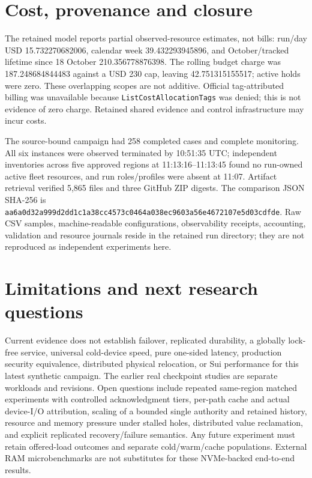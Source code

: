 \documentclass[11pt,a4paper]{article}
\begin{document}
\section{Cost, provenance and closure}\label{sec:provenance}
The retained model reports partial observed-resource estimates, not bills: run/day USD 15.732270682006, calendar week 39.432293945896, and October/tracked lifetime since 18 October 210.356778876398. The rolling budget charge was 187.248684844483 against a USD 230 cap, leaving 42.751315155517; active holds were zero. These overlapping scopes are not additive. Official tag-attributed billing was unavailable because \texttt{ListCostAllocationTags} was denied; this is not evidence of zero charge. Retained shared evidence and control infrastructure may incur costs.

The source-bound campaign had 258 completed cases and complete monitoring. All six instances were observed terminated by 10:51:35 UTC; independent inventories across five approved regions at 11:13:16--11:13:45 found no run-owned active fleet resources, and run roles/profiles were absent at 11:07. Artifact retrieval verified 5,865 files and three GitHub ZIP digests. The comparison JSON SHA-256 is \texttt{aa6a0d32a999d2dd\allowbreak 1c1a38cc4573c046\allowbreak 4a038ec9603a56e4\allowbreak 672107e5d03cdfde}. Raw CSV samples, machine-readable configurations, observability receipts, accounting, validation and resource journals reside in the retained run directory; they are not reproduced as independent experiments here.

\section{Limitations and next research questions}\label{sec:limitations}
Current evidence does not establish failover, replicated durability, a globally lock-free service, universal cold-device speed, pure one-sided latency, production security equivalence, distributed physical relocation, or Sui performance for this latest synthetic campaign. The earlier real checkpoint studies are separate workloads and revisions. Open questions include repeated same-region matched experiments with controlled acknowledgment tiers, per-path cache and actual device-I/O attribution, scaling of a bounded single authority and retained history, resource and memory pressure under stalled holes, distributed value reclamation, and explicit replicated recovery/failure semantics. Any future experiment must retain offered-load outcomes and separate cold/warm/cache populations. External RAM microbenchmarks are not substitutes for these NVMe-backed end-to-end results.
\end{document}
